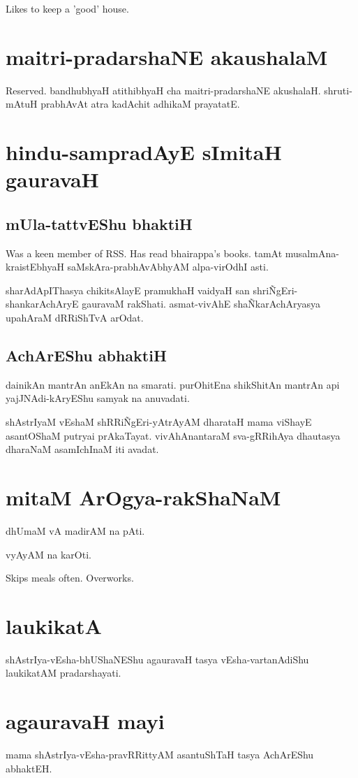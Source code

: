 \documentclass[oneside, article]{memoir}
\begin{document}
Likes to keep a 'good' house.

\section{maitri-pradarshaNE akaushalaM}
Reserved. bandhubhyaH atithibhyaH cha maitri-pradarshaNE akushalaH. shruti-mAtuH prabhAvAt atra kadAchit adhikaM prayatatE.

\section{hindu-sampradAyE sImitaH gauravaH}
\subsection{mUla-tattvEShu bhaktiH}
Was a keen member of RSS. Has read bhairappa's books. tamAt musalmAna-kraistEbhyaH saMskAra-prabhAvAbhyAM alpa-virOdhI asti.

sharAdApIThasya chikitsAlayE pramukhaH vaidyaH san shri\~NgEri-shankarAchAryE gauravaM rakShati. asmat-vivAhE sha\~NkarAchAryasya upahAraM dRRiShTvA arOdat.

\subsection{AchArEShu abhaktiH}
dainikAn mantrAn anEkAn na smarati. purOhitEna shikShitAn mantrAn api yajJNAdi-kAryEShu samyak na anuvadati.

shAstrIyaM vEshaM shRRi\~NgEri-yAtrAyAM dharataH mama viShayE asantOShaM putryai prAkaTayat. vivAhAnantaraM sva-gRRihAya dhautasya dharaNaM asamIchInaM iti avadat.

\section{mitaM ArOgya-rakShaNaM}
dhUmaM vA madirAM na pAti.

vyAyAM na karOti.

Skips meals often. Overworks.

\section{laukikatA}
shAstrIya-vEsha-bhUShaNEShu agauravaH tasya vEsha-vartanAdiShu laukikatAM pradarshayati.

\section{agauravaH mayi}
mama shAstrIya-vEsha-pravRRittyAM asantuShTaH tasya AchArEShu abhaktEH.
\end{document}
